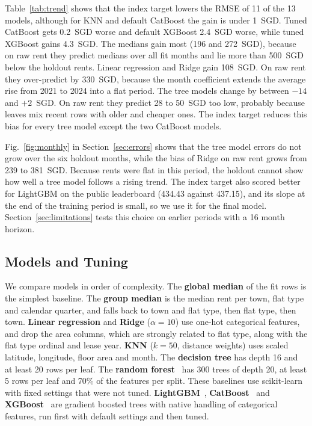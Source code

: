 \begin{table}[htbp]
\caption{Time holdout RMSE (SGD) with the raw target and the index target, G0+G1 features. Change is index minus raw.}
\label{tab:trend}
\centering
\footnotesize

\end{table}

Table~\ref{tab:trend} shows that the index target lowers the RMSE of 11 of the 13 models, although for KNN and default CatBoost the gain is under 1~SGD. Tuned CatBoost gets 0.2~SGD worse and default XGBoost 2.4~SGD worse, while tuned XGBoost gains 4.3~SGD. The medians gain most (196 and 272~SGD), because on raw rent they predict medians over all fit months and lie more than 500~SGD below the holdout rents. Linear regression and Ridge gain 108~SGD. On raw rent they over-predict by 330~SGD, because the month coefficient extends the average rise from 2021 to 2024 into a flat period. The tree models change by between $-14$ and $+2$~SGD. On raw rent they predict 28 to 50~SGD too low, probably because leaves mix recent rows with older and cheaper ones. The index target reduces this bias for every tree model except the two CatBoost models.

Fig.~\ref{fig:monthly} in Section~\ref{sec:errors} shows that the tree model errors do not grow over the six holdout months, while the bias of Ridge on raw rent grows from 239 to 381~SGD. Because rents were flat in this period, the holdout cannot show how well a tree model follows a rising trend. The index target also scored better for LightGBM on the public leaderboard (434.43 against 437.15), and its slope at the end of the training period is small, so we use it for the final model. Section~\ref{sec:limitations} tests this choice on earlier periods with a 16 month horizon.

\subsection{Models and Tuning}\label{sec:models}

We compare models in order of complexity. The \textbf{global median} of the fit rows is the simplest baseline. The \textbf{group median} is the median rent per town, flat type and calendar quarter, and falls back to town and flat type, then flat type, then town. \textbf{Linear regression} and \textbf{Ridge} ($\alpha = 10$) use one-hot categorical features, and drop the area columns, which are strongly related to flat type, along with the flat type ordinal and lease year. \textbf{KNN} ($k = 50$, distance weights) uses scaled latitude, longitude, floor area and month. The \textbf{decision tree} has depth 16 and at least 20 rows per leaf. The \textbf{random forest}~\cite{breiman2001random} has 300 trees of depth 20, at least 5 rows per leaf and 70\% of the features per split. These baselines use scikit-learn~\cite{pedregosa2011scikit} with fixed settings that were not tuned. \textbf{LightGBM}~\cite{ke2017lightgbm}, \textbf{CatBoost}~\cite{prokhorenkova2018catboost} and \textbf{XGBoost}~\cite{chen2016xgboost} are gradient boosted trees with native handling of categorical features, run first with default settings and then tuned.

